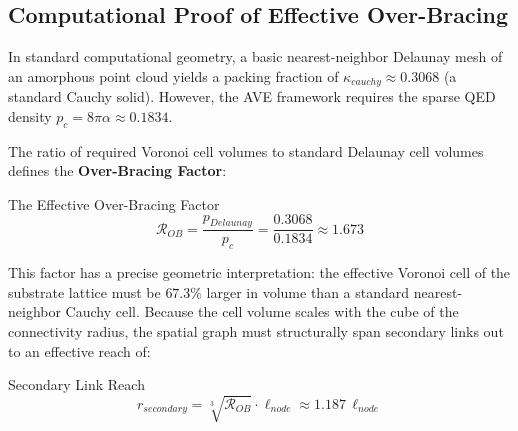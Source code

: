 \subsection{Computational Proof of Effective Over-Bracing}
In standard computational geometry, a basic nearest-neighbor Delaunay mesh of an amorphous point cloud yields a packing fraction of $\kappa_{cauchy} \approx 0.3068$ (a standard Cauchy solid). However, the AVE framework requires the sparse QED density $p_c = 8\pi\alpha \approx 0.1834$.

The ratio of required Voronoi cell volumes to standard Delaunay cell volumes defines the \textbf{Over-Bracing Factor}:
\begin{resultbox}{The Effective Over-Bracing Factor}
\begin{equation}
    \mathcal{R}_{OB} = \frac{p_{Delaunay}}{p_c} = \frac{0.3068}{0.1834} \approx \mathbf{1.673}
\end{equation}
\end{resultbox}

This factor has a precise geometric interpretation: the effective Voronoi cell of the substrate lattice must be $67.3\%$ larger in volume than a standard nearest-neighbor Cauchy cell. Because the cell volume scales with the cube of the connectivity radius, the spatial graph must structurally span secondary links out to an effective reach of:
\begin{resultbox}{Secondary Link Reach}
\begin{equation}
    r_{secondary} = \sqrt[3]{\mathcal{R}_{OB}} \cdot \ell_{node} \approx 1.187 \, \ell_{node}
\end{equation}
\end{resultbox}

